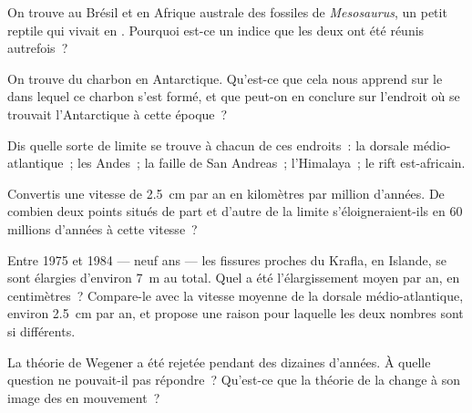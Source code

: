 \begin{exercise}[$\star$]\label{exo:g7:plate-tectonics:4}
On trouve au Brésil et en Afrique australe des fossiles de
\emph{Mesosaurus}, un petit reptile qui vivait en . Pourquoi est-ce
un indice que les deux  ont été réunis autrefois~?
\end{exercise}

\begin{exercise}[$\star\star$]\label{exo:g7:plate-tectonics:5}
On trouve du charbon en Antarctique. Qu'est-ce que cela nous apprend sur le
 dans lequel ce charbon s'est formé, et que peut-on en conclure sur
l'endroit où se trouvait l'Antarctique à cette époque~?
\end{exercise}

\begin{exercise}[$\star\star$]\label{exo:g7:plate-tectonics:6}
Dis quelle sorte de limite se trouve à chacun de ces endroits~: la dorsale
médio-atlantique~; les Andes~; la faille de San Andreas~; l'Himalaya~; le
rift est-africain.
\end{exercise}

\begin{exercise}[$\star\star$]\label{exo:g7:plate-tectonics:7}
Convertis une vitesse de \qty{2.5}{cm} par an en kilomètres par million
d'années. De combien deux points situés de part et d'autre de la limite
s'éloigneraient-ils en 60 millions d'années à cette vitesse~?
\end{exercise}

\begin{exercise}[$\star\star$]\label{exo:g7:plate-tectonics:8}
Entre 1975 et 1984 --- neuf ans --- les fissures proches du  Krafla,
en Islande, se sont élargies d'environ \qty{7}{m} au total. Quel a été
l'élargissement moyen par an, en centimètres~? Compare-le avec la vitesse
moyenne de la dorsale médio-atlantique, environ \qty{2.5}{cm} par an, et
propose une raison pour laquelle les deux nombres sont si différents.
\end{exercise}

\begin{exercise}[$\star\star$]\label{exo:g7:plate-tectonics:9}
La théorie de Wegener a été rejetée pendant des dizaines d'années. À quelle
question ne pouvait-il pas répondre~? Qu'est-ce que la théorie de la
 change à son image des  en mouvement~?
\end{exercise}

